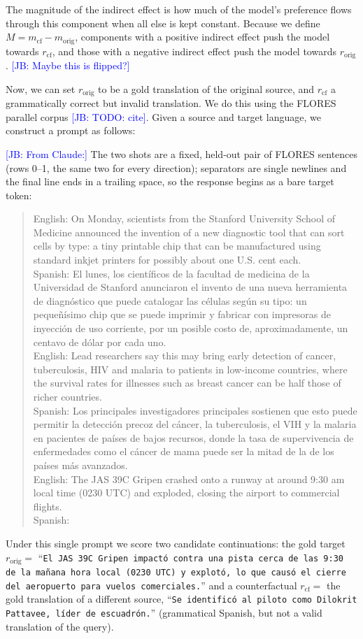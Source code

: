 \documentclass[11pt]{article}
\newcommand{\jb}[1]{\textcolor{blue}{[JB: #1]}}
\begin{document}
The magnitude of the indirect effect is how much of the model's preference flows through this component when all else is kept constant. Because we define $M = m_{\text{cf}} - m_{\text{orig}}$, components with a positive indirect effect push the model towards $r_\text{cf}$, and those with a negative indirect effect push the model towards $r_\text{orig}$. \jb{Maybe this is flipped?}

Now, we can set $r_{\text{orig}}$ to be a gold translation of the original source, and $r_{\text{cf}}$ a grammatically correct but invalid translation. We do this using the FLORES parallel corpus \jb{TODO: cite}. Given a source and target language, we construct a prompt as follows:

\jb{From Claude:}
The two shots are a fixed, held-out pair of FLORES sentences (rows 0--1, the same
two for every direction); separators are single newlines and the final line ends
in a trailing space, so the response begins as a bare target token:
\begin{quote}\ttfamily\small\setlength{\parindent}{0pt}
English: On Monday, scientists from the Stanford University School of Medicine announced the invention of a new diagnostic tool that can sort cells by type: a tiny printable chip that can be manufactured using standard inkjet printers for possibly about one U.S. cent each.\\
Spanish: El lunes, los científicos de la facultad de medicina de la Universidad de Stanford anunciaron el invento de una nueva herramienta de diagnóstico que puede catalogar las células según su tipo: un pequeñísimo chip que se puede imprimir y fabricar con impresoras de inyección de uso corriente, por un posible costo de, aproximadamente, un centavo de dólar por cada uno.\\
English: Lead researchers say this may bring early detection of cancer, tuberculosis, HIV and malaria to patients in low-income countries, where the survival rates for illnesses such as breast cancer can be half those of richer countries.\\
Spanish: Los principales investigadores principales sostienen que esto puede permitir la detección precoz del cáncer, la tuberculosis, el VIH y la malaria en pacientes de países de bajos recursos, donde la tasa de supervivencia de enfermedades como el cáncer de mama puede ser la mitad de la de los países más avanzados.\\
English: The JAS 39C Gripen crashed onto a runway at around 9:30 am local time (0230 UTC) and exploded, closing the airport to commercial flights.\\
Spanish:
\end{quote}
Under this single prompt we score two candidate continuations: the gold target
$r_{\text{orig}} =$ ``\texttt{El JAS 39C Gripen impactó contra una pista cerca de
las 9:30 de la mañana hora local (0230 UTC) y explotó, lo que causó el cierre del
aeropuerto para vuelos comerciales.}'' and a counterfactual $r_{\text{cf}} =$ the
gold translation of a different source, ``\texttt{Se identificó al piloto como
Dilokrit Pattavee, líder de escuadrón.}'' (grammatical Spanish, but not a valid
translation of the query).
\end{document}
